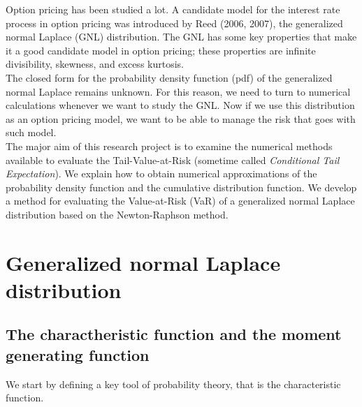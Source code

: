 \documentclass[12pt,travaildirige,nobabel, twoside]{dms}
\numberwithin{equation}{section}
\numberwithin{table}{chapter}
\numberwithin{figure}{chapter}
\begin{document}

Option pricing has been studied a lot. A candidate model for the interest rate process in option pricing was introduced by Reed (2006, 2007), the generalized normal Laplace (GNL) distribution. The GNL has some key properties that make it a good candidate model in option pricing; these properties are infinite divisibility, skewness, and excess kurtosis.\\


The closed form for the probability density function (pdf) of the generalized normal Laplace remains unknown. For this reason, we need to turn to numerical calculations whenever we want to study the GNL. Now if we use this distribution as an option pricing model, we want to be able to manage the risk that goes with such model.\\

The major aim of this research project is to examine the numerical methods available to evaluate the Tail-Value-at-Risk (sometime called \textit{Conditional Tail Expectation}). We explain how to obtain numerical approximations of the probability density function and the cumulative distribution function. We develop a method for evaluating the Value-at-Risk (VaR) of a generalized normal Laplace distribution based on the Newton-Raphson method. 




\chapter{Generalized normal Laplace distribution}




\section{The charactheristic function and the moment generating function}


We start by defining a key tool of probability theory, that is the characteristic function. \\
\end{document}
